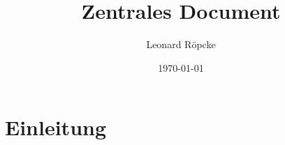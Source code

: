 \documentclass[12pt,a4paper]{article}
\title{Zentrales Document}
\author{Leonard Röpcke}
\date{\today}
\begin{document}
\maketitle
\tableofcontents
\newpage

\section{Einleitung}
\end{document}
